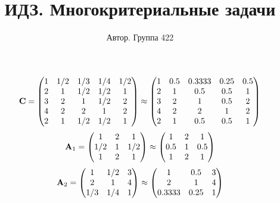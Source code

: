 \documentclass[10pt,a4paper]{article}
\title{ИДЗ. Многокритериальные задачи}
\author{Автор. Группа 422}
\begin{document}
	\maketitle
	
	\[
		\bold{C} = 
		\begin{pmatrix}
			{1}{} & {1} / {{2}} & {1} / {{3}} & {1} / {{4}} & {1} / {{2}} \\
			{{2}}{} & {1}{} & {1} / {{2}} & {1} / {{2}} & {1}{} \\
			{{3}}{} & {{2}}{} & {1}{} & {1} / {{2}} & {{2}}{} \\
			{{4}}{} & {{2}}{} & {{2}}{} & {1}{} & {{2}}{} \\
			{{2}}{} & {1}{} & {1} / {{2}} & {1} / {{2}} & {1}{} \\
		\end{pmatrix}
		\approx
		\begin{pmatrix}
			1        & 0.5      & 0.3333   & 0.25     & 0.5      \\
			2        & 1        & 0.5      & 0.5      & 1        \\
			3        & 2        & 1        & 0.5      & 2        \\
			4        & 2        & 2        & 1        & 2        \\
			2        & 1        & 0.5      & 0.5      & 1        \\
		\end{pmatrix}
	\]
	\[
		\bold{A}_{1} = 
		\begin{pmatrix}
			{1}{} & {{2}}{} & {1}{} \\
			{1} / {{2}} & {1}{} & {1} / {{2}} \\
			{1}{} & {{2}}{} & {1}{} \\
		\end{pmatrix}
		\approx
		\begin{pmatrix}
			1        & 2        & 1        \\
			0.5      & 1        & 0.5      \\
			1        & 2        & 1        \\
		\end{pmatrix}
	\]
	\[
		\bold{A}_{2} = 
		\begin{pmatrix}
			{1}{} & {1} / {{2}} & {{3}}{} \\
			{{2}}{} & {1}{} & {{4}}{} \\
			{1} / {{3}} & {1} / {{4}} & {1}{} \\
		\end{pmatrix}
		\approx
		\begin{pmatrix}
			1        & 0.5      & 3        \\
			2        & 1        & 4        \\
			0.3333   & 0.25     & 1        \\
		\end{pmatrix}
	\]
\end{document}
